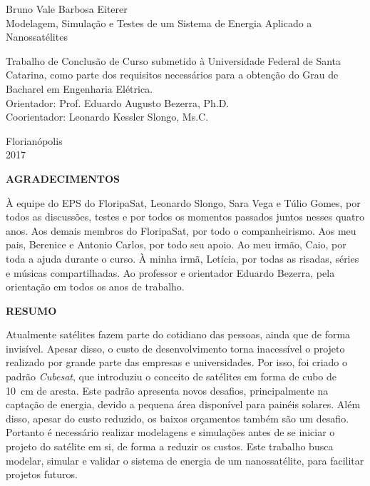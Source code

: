 \documentclass[a5paper, oldfontcommands, hidelinks]{ufsc-thesis}  %
\begin{document}
\pretextual%
\imprimircapa%
\begin{center}
Bruno Vale Barbosa Eiterer \\
\vspace{\fill}
\Large{Modelagem, Simulação e Testes de um Sistema de Energia Aplicado a Nanossatélites} \\
\vspace{\fill}
\end{center}
\hfill
\begin{minipage}{0.5\textwidth}
\raggedright \small Trabalho de Conclusão de Curso submetido à Universidade Federal de Santa Catarina, como parte dos requisitos necessários para a obtenção do Grau de Bacharel em Engenharia Elétrica. \\
Orientador: Prof. Eduardo Augusto Bezerra, Ph.D. \\
Coorientador: Leonardo Kessler Slongo, Ms.C.
\end{minipage}
\vfill
\begin{center}
Florianópolis \\
2017
\end{center}


\clearpage
\imprimirfichacatalografica%
\textual%

\clearpage
\begin{center}
\large\textbf{AGRADECIMENTOS}
\end{center}
À equipe do EPS do FloripaSat, Leonardo Slongo, Sara Vega e Túlio Gomes, por todos as discussões, testes e por todos os momentos passados juntos nesses quatro anos. Aos demais membros do FloripaSat, por todo o companheirismo. Aos meu pais, Berenice e Antonio Carlos, por todo seu apoio. Ao meu irmão, Caio, por toda a ajuda durante o curso. À minha irmã, Letícia, por todas as risadas, séries e músicas compartilhadas. Ao professor e orientador Eduardo Bezerra, pela orientação em todos os anos de trabalho. 

\clearpage
\begin{center}
\large\textbf{RESUMO}
\end{center}
Atualmente satélites fazem parte do cotidiano das pessoas, ainda que de forma invisível. Apesar disso, o custo de desenvolvimento torna inacessível o projeto realizado por grande parte das empresas e universidades. Por isso, foi criado o padrão \textit{Cubesat}, que introduziu o conceito de satélites em forma de cubo de \SI{10}{\centi\metre} de aresta. Este padrão apresenta novos desafios, principalmente na captação de energia, devido a pequena área disponível para painéis solares. Além disso, apesar do custo reduzido, os baixos orçamentos também são um desafio. Portanto é necessário realizar modelagens e simulações antes de se iniciar o projeto do satélite em si, de forma a reduzir os custos. Este trabalho busca modelar, simular e validar o sistema de energia de um nanossatélite, para facilitar projetos futuros.
\end{document}
